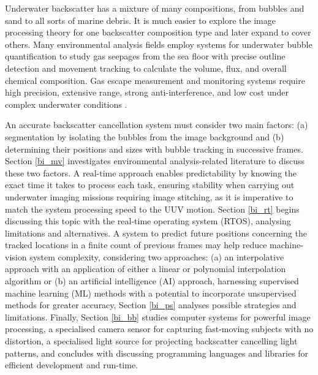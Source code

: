 Underwater backscatter has a mixture of many compositions, from bubbles and sand to all sorts of marine debris. It is much easier to explore the image processing theory for one backscatter composition type and later expand to cover others. Many environmental analysis fields employ systems for underwater bubble quantification to study gas seepages from the sea floor with precise outline detection and movement tracking to calculate the volume, flux, and overall chemical composition. Gas escape measurement and monitoring systems require high precision, extensive range, strong anti-interference, and low cost under complex underwater conditions \cite{zhangUnderwaterBubbleEscape2023}.

An accurate backscatter cancellation system must consider two main factors: (a) segmentation by isolating the bubbles from the image background and (b) determining their positions and sizes with bubble tracking in successive frames. Section \ref{bi_mv} investigates environmental analysis-related literature to discuss these two factors. A real-time approach enables predictability by knowing the exact time it takes to process each task, ensuring stability when carrying out underwater imaging missions requiring image stitching, as it is imperative to match the system processing speed to the UUV motion. Section \ref{bi_rt} begins discussing this topic with the real-time operating system (RTOS), analysing limitations and alternatives. A system to predict future positions concerning the tracked locations in a finite count of previous frames may help reduce machine-vision system complexity, considering two approaches: (a) an interpolative approach with an application of either a linear or polynomial interpolation algorithm or (b) an artificial intelligence (AI) approach, harnessing supervised machine learning (ML) methods with a potential to incorporate unsupervised methods for greater accuracy, Section \ref{bi_ps} analyses possible strategies and limitations. Finally, Section \ref{bi_bb} studies computer systems for powerful image processing, a specialised camera sensor for capturing fast-moving subjects with no distortion, a specialised light source for projecting backscatter cancelling light patterns, and concludes with discussing programming languages and libraries for efficient development and run-time.

